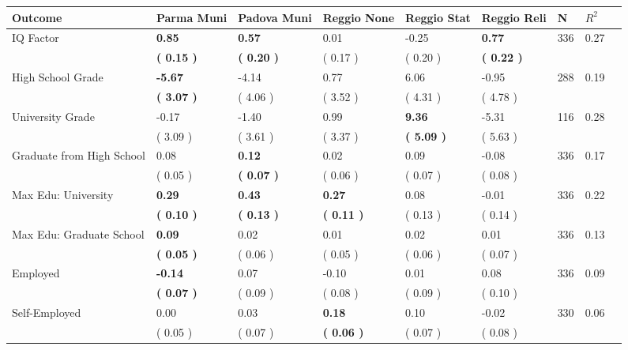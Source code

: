\begin{tabular}{L{6.2cm} C{1.8cm} C{1.8cm} C{1.8cm} C{1.8cm} C{1.8cm} C{1.8cm} C{0.3cm} C{0.3cm}}
\toprule
 \textbf{Outcome} & \textbf{Parma Muni} & \textbf{Padova Muni} & \textbf{Reggio None} & \textbf{Reggio Stat} & \textbf{Reggio Reli} & \textbf{N} & \textbf{$ R^2$} \\
\midrule
IQ Factor & \textbf{     0.85} & \textbf{     0.57} &      0.01 &     -0.25 & \textbf{     0.77}  & 336 &       0.27 \\ 
 & \textbf{(     0.15 )} & \textbf{(     0.20 )} & (     0.17 ) & (     0.20 ) & \textbf{(     0.22 )}  & \\
High School Grade & \textbf{    -5.67} &     -4.14 &      0.77 &      6.06 &     -0.95  & 288 &       0.19 \\ 
 & \textbf{(     3.07 )} & (     4.06 ) & (     3.52 ) & (     4.31 ) & (     4.78 )  & \\
University Grade &     -0.17 &     -1.40 &      0.99 & \textbf{     9.36} &     -5.31  & 116 &       0.28 \\ 
 & (     3.09 ) & (     3.61 ) & (     3.37 ) & \textbf{(     5.09 )} & (     5.63 )  & \\
Graduate from High School &      0.08 & \textbf{     0.12} &      0.02 &      0.09 &     -0.08  & 336 &       0.17 \\ 
 & (     0.05 ) & \textbf{(     0.07 )} & (     0.06 ) & (     0.07 ) & (     0.08 )  & \\
Max Edu: University & \textbf{     0.29} & \textbf{     0.43} & \textbf{     0.27} &      0.08 &     -0.01  & 336 &       0.22 \\ 
 & \textbf{(     0.10 )} & \textbf{(     0.13 )} & \textbf{(     0.11 )} & (     0.13 ) & (     0.14 )  & \\
Max Edu: Graduate School & \textbf{     0.09} &      0.02 &      0.01 &      0.02 &      0.01  & 336 &       0.13 \\ 
 & \textbf{(     0.05 )} & (     0.06 ) & (     0.05 ) & (     0.06 ) & (     0.07 )  & \\
Employed & \textbf{    -0.14} &      0.07 &     -0.10 &      0.01 &      0.08  & 336 &       0.09 \\ 
 & \textbf{(     0.07 )} & (     0.09 ) & (     0.08 ) & (     0.09 ) & (     0.10 )  & \\
Self-Employed &      0.00 &      0.03 & \textbf{     0.18} &      0.10 &     -0.02  & 330 &       0.06 \\ 
 & (     0.05 ) & (     0.07 ) & \textbf{(     0.06 )} & (     0.07 ) & (     0.08 )  & \\

\end{tabular}
